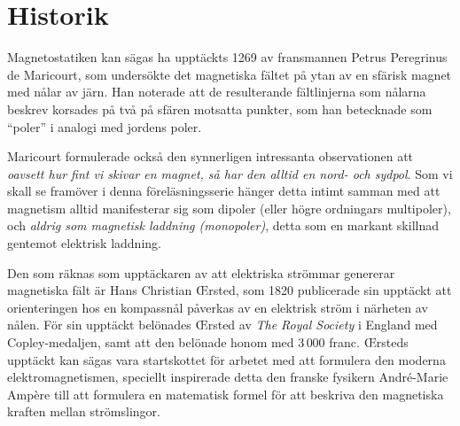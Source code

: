 {{\section{Historik}
Magnetostatiken kan s{\"a}gas ha uppt{\"a}ckts 1269 av fransmannen Petrus
Peregrinus de Maricourt, som
unders{\"o}kte det magnetiska f{\"a}ltet p{\aa} ytan av en sf{\"a}risk
magnet med n{\aa}lar av j{\"a}rn. Han noterade att de
resulterande f{\"a}ltlinjerna som n{\aa}larna beskrev korsades p{\aa} tv{\aa}
p{\aa} sf{\"a}ren motsatta punkter, som han betecknade som ``poler''
 i analogi
med jordens poler.

Maricourt formulerade ocks{\aa} den synnerligen intressanta observationen att
{\it oavsett hur fint vi skivar en magnet, s{\aa} har den alltid en nord- och
sydpol}. Som vi skall se fram{\"o}ver i denna f{\"o}rel{\"a}sningsserie
h{\"a}nger detta intimt samman med att magnetism alltid manifesterar sig
som dipoler (eller h{\"o}gre ordningars multipoler), och {\it aldrig som
magnetisk laddning (monopoler)}, detta som en markant
skillnad gentemot elektrisk laddning.

Den som r{\"a}knas som uppt{\"a}ckaren av att elektriska str{\"o}mmar genererar
magnetiska f{\"a}lt {\"a}r Hans Christian {\OE}rsted,  som 1820 publicerade sin uppt{\"a}ckt att orienteringen
hos en kompassn{\aa}l p{\aa}verkas av en elektrisk str{\"o}m i n{\"a}rheten av
n{\aa}len.
F{\"o}r sin uppt{\"a}ckt bel{\"o}nades {\OE}rsted av {\it The Royal Society} i
England med Copley-medaljen, samt att den  bel{\"o}nade
honom med $3\,000$ franc.
{\OE}rsteds uppt{\"a}ckt kan s{\"a}gas vara startskottet f{\"o}r arbetet med
att formulera den moderna elektromagnetismen, speciellt inspirerade detta den
franske fysikern Andr{\'e}-Marie Amp{\`e}re  till att formulera en matematisk formel f{\"o}r att beskriva den
magnetiska kraften mellan str{\"o}mslingor.
\vfill\eject

}}
